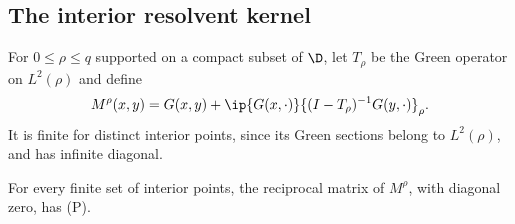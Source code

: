 \subsection{The interior resolvent kernel}

For $0\le\rho\le q$ supported on a compact subset of $\D$, let $T_\rho$ be the Green operator on $L^2(\rho)$ and define
\begin{equation}\label{eq:M-rho}
M^\rho(x,y)=G(x,y)
+\ip{G(x,\cdot)}{(I-T_\rho)^{-1}G(y,\cdot)}_\rho.
\end{equation}
It is finite for distinct interior points, since its Green sections belong to $L^2(\rho)$, and has infinite diagonal.

\begin{proposition}\label{prop:interior-reciprocal}
For every finite set of interior points, the reciprocal matrix of $M^\rho$, with diagonal zero, has \textup{(P)}.
\end{proposition}
